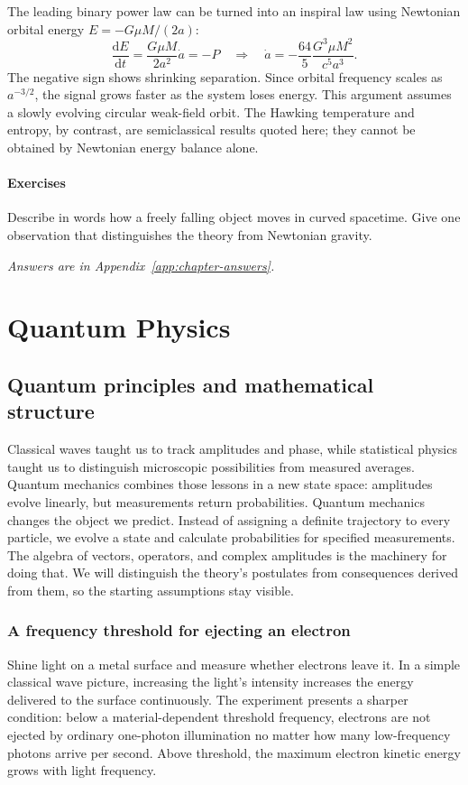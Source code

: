 \documentclass[11pt,oneside]{book}
\newcommand{\dd}{\mathrm{d}}
\newcommand{\od}[2]{\frac{\dd #1}{\dd #2}}
\theoremstyle{reviewstyle}
\newcommand{\learningcheck}[1]{\subsection*{Exercises}\noindent #1\par\smallskip\noindent\emph{Answers are in Appendix~\ref{app:chapter-answers}.}}
\begin{document}
The leading binary power law can be turned into an inspiral law using Newtonian orbital energy $E=-G\mu M/(2a)$:
\begin{equation}
\od Et=\frac{G\mu M}{2a^2}\dot a=-P
\quad\Longrightarrow\quad
\dot a=-\frac{64}{5}\frac{G^3\mu M^2}{c^5a^3}.
\end{equation}
The negative sign shows shrinking separation. Since orbital frequency scales as $a^{-3/2}$, the signal grows faster as the system loses energy. This argument assumes a slowly evolving circular weak-field orbit. The Hawking temperature and entropy, by contrast, are semiclassical results quoted here; they cannot be obtained by Newtonian energy balance alone.

\learningcheck{Describe in words how a freely falling object moves in curved spacetime. Give one observation that distinguishes the theory from Newtonian gravity.}

\part{Quantum Physics}
\chapter{Quantum principles and mathematical structure}
Classical waves taught us to track amplitudes and phase, while statistical physics taught us to distinguish microscopic possibilities from measured averages. Quantum mechanics combines those lessons in a new state space: amplitudes evolve linearly, but measurements return probabilities.
Quantum mechanics changes the object we predict. Instead of assigning a definite trajectory to every particle, we evolve a state and calculate probabilities for specified measurements. The algebra of vectors, operators, and complex amplitudes is the machinery for doing that. We will distinguish the theory's postulates from consequences derived from them, so the starting assumptions stay visible.

\section{A frequency threshold for ejecting an electron}
Shine light on a metal surface and measure whether electrons leave it. In a simple classical wave picture, increasing the light's intensity increases the energy delivered to the surface continuously. The experiment presents a sharper condition: below a material-dependent threshold frequency, electrons are not ejected by ordinary one-photon illumination no matter how many low-frequency photons arrive per second. Above threshold, the maximum electron kinetic energy grows with light frequency.
\end{document}

